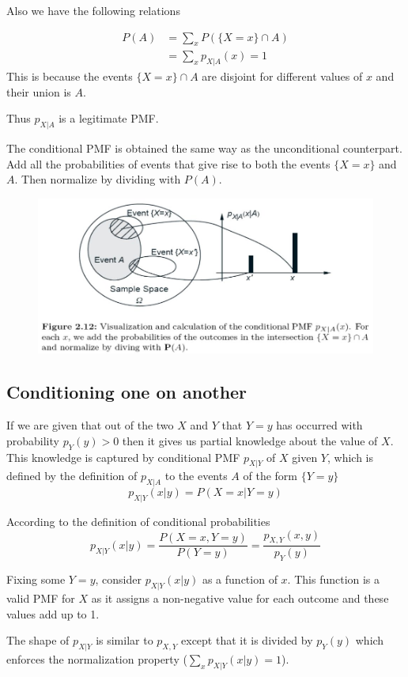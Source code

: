Also we have the following relations

\begin{align*}
    P(A) &= \sum_x P(\{X=x\} \cap A) \\
     &= \sum_x p_{X|A}(x)    = 1
\end{align*}
This is because the events $\{X=x\} \cap A$ are disjoint for different values of $x$ and their union is $A$.

\begin{remark}
    Thus $p_{X|A}$ is a legitimate PMF.
\end{remark}

The conditional PMF is obtained the same way as the unconditional counterpart. Add all the probabilities of events that give rise to both the events $\{X=x\}$ and $A$. Then normalize by dividing with $P(A)$.

\begin{figure}[h]
    \center
    \includegraphics[width=.7\textwidth]{images/P_conditional_pmf.jpg}
 \end{figure}

 \subsection{Conditioning one \RV on another}
 If we are given that out of the two \rv $X$ and $Y$ that $Y=y$ has occurred with probability $p_Y(y)>0$ then it gives us partial knowledge about the value of $X$. This knowledge is captured by conditional PMF $p_{X|Y}$ of $X$ given $Y$, which is defined by the definition of $p_{X|A}$ to the events $A$ of the form $\{Y=y\}$
 \[p_{X|Y}(x|y)= P(X=x|Y=y)\]

 According to the definition of conditional probabilities
 \[p_{X|Y}(x|y)=\frac{P(X=x,Y=y)}{P(Y=y)} = \frac{p_{X,Y}(x,y)}{p_Y(y)}\]

 Fixing some $Y=y$, consider $p_{X|Y}(x|y)$ as a function of $x$. This function is a valid PMF for $X$ as it assigns a non-negative value for each outcome and these values add up to 1.

 The shape of $p_{X|Y}$ is similar to $p_{X,Y}$  except that it is divided by $p_Y(y)$ which enforces the normalization property ($\sum_x p_{X|Y}(x|y)=1$).

